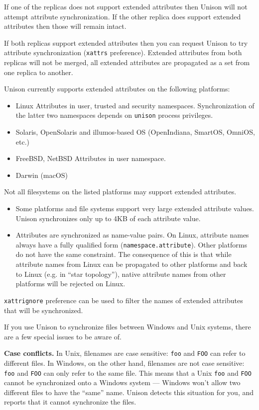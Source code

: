 \documentclass{article}
\begin{document}
If one of the replicas does not support extended attributes then
Unison will not attempt attribute synchronization. If the other
replica does support extended attributes then those will remain intact.

If both replicas support extended attributes then you can request
Unison to try attribute synchronization (\verb|xattrs| preference).
Extended attributes from both replicas will not be merged, all extended
attributes are propagated as a set from one replica to another.

Unison currently supports extended attributes on the following platforms:
\begin{itemize}
\item Linux
Attributes in user, trusted and security namespaces. Synchronization of
the latter two namespaces depends on \verb|unison| process privileges.
\item Solaris, OpenSolaris and illumos-based OS (OpenIndiana, SmartOS,
  OmniOS, etc.)
\item FreeBSD, NetBSD
Attributes in user namespace.
\item Darwin (macOS)
\end{itemize}
Not all filesystems on the listed platforms may support extended attributes.

\begin{itemize}
\item Some platforms and file systems support very large extended attribute
values. Unison synchronizes only up to 4KB of each attribute value.
\item Attributes are synchronized as name-value pairs. On Linux, attribute
names always have a fully qualified form (\texttt{namespace.attribute}).
Other platforms do not have the same constraint.
The consequence of this is that while attribute names from Linux can be
propagated to other platforms and back to Linux (e.g. in ``star topology''),
native attribute names from other platforms will be rejected on Linux.
\end{itemize}

\verb|xattrignore| preference can be used to filter the names of extended
attributes that will be synchronized.


If you use Unison to synchronize files between Windows and Unix
systems, there are a few special issues to be aware of.

\textbf{Case conflicts.}  In Unix, filenames are case sensitive:
\texttt{foo} and \texttt{FOO} can refer to different files.  In
Windows, on the other hand, filenames are not case sensitive:
\texttt{foo} and \texttt{FOO} can only refer to the same file.  This
means that a Unix \texttt{foo} and \texttt{FOO} cannot be synchronized
onto a Windows system --- Windows won't allow two different files to
have the ``same'' name.  Unison detects this situation for you, and
reports that it cannot synchronize the files.
\end{document}
